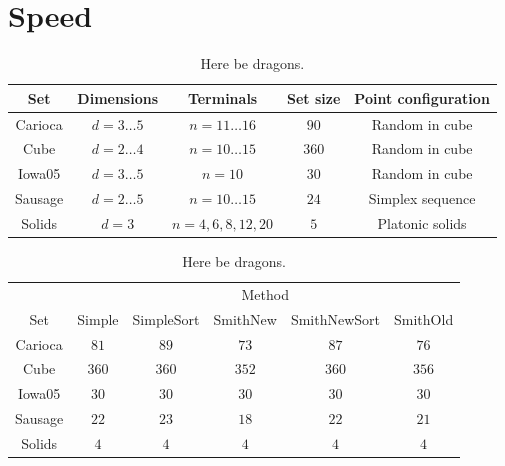 \section{Speed}
\label{sec:speed}

\begin{table}[htbp]
  \centering
  \begin{tabular}{ccccc}
    \toprule
    Set     & Dimensions       & Terminals             & Set size & Point configuration \\
    \midrule
    Carioca & $d = 3 \ldots 5$ & $n = 11 \ldots 16$    & $90$       & Random in cube      \\
    Cube    & $d = 2 \ldots 4$ & $n = 10 \ldots 15$    & $360$      & Random in cube      \\
    Iowa05  & $d = 3 \ldots 5$ & $n = 10$              & $30$       & Random in cube      \\
    Sausage & $d = 2 \ldots 5$ & $n = 10 \ldots 15$    & $24$       & Simplex sequence    \\
    Solids  & $d = 3$          & $n = 4, 6, 8, 12, 20$ & $5$        & Platonic solids     \\
    \bottomrule
  \end{tabular}
  \caption[Here be dragons]{Here be dragons.\label{tab:test-sets}}
\end{table}

\begin{table}[htbp]
  \centering
  \begin{tabular}{cccccc}
    \toprule
            & \multicolumn{5}{c}{Method}                               \\
    \cmidrule(l){2-6}
    Set     & Simple & SimpleSort & SmithNew & SmithNewSort & SmithOld \\
    \cmidrule(r){1-1}\cmidrule(l){2-6}
    Carioca & $81$   & $89$       & $73$     & $87$         & $76$     \\
    Cube    & $360$  & $360$      & $352$    & $360$        & $356$    \\
    Iowa05  & $30$   & $30$       & $30$     & $30$         & $30$     \\
    Sausage & $22$   & $23$       & $18$     & $22$         & $21$     \\
    Solids  & $4$    & $4$        & $4$      & $4$          & $4$      \\
    \bottomrule
  \end{tabular}
  \caption[Here be dragons]{Here be dragons.\label{tab:set-success}}
\end{table}

